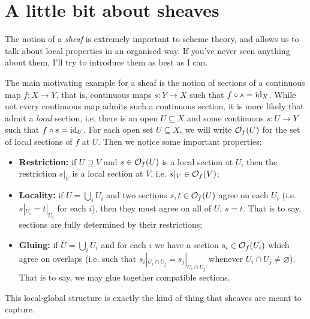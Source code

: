 \section{A little bit about sheaves}
\label{appendix:A_sheaves}
The notion of a \emph{sheaf} is extremely important to scheme theory, and allows us to talk about local properties in an organised way. If you've never seen anything about them, I'll try to introduce them as best as I can.

\begin{eg}
	The main motivating example for a sheaf is the notion of sections of a continuous map $f:X \to Y$, that is, continuous maps $s:Y \to X$ such that $f \circ s = \mathrm{id}_X$. While not every continuous map admits such a continuous section, it is more likely that admit a \emph{local} section, i.e. there is an open $U \subseteq X$ and some continuous $s : U \to Y$ such that $f \circ s = \mathrm{id}_U$. For each open set $U \subseteq X$, we will write $\mathcal{O}_f (U)$ for the set of local sections of $f$ at $U$. Then we notice some important properties:
	\begin{itemize}
		\item \textbf{Restriction:} if $U \supseteq V$ and $s \in \mathcal{O}_f(U)$ is a local section at $U$, then the restriction $s|_V$ is a local section at $V$, i.e. $s|_V \in \mathcal{O}_f(V)$;
		\item \textbf{Locality:} if $U = \bigcup_i U_i$ and two sections $s,t \in \mathcal{O}_f(U)$ agree on each $U_i$ (i.e. $s|_{U_i} = t|_{U_i}$ for each $i$), then they must agree on all of $U$, $s=t$. That is to say, sections are fully determined by their restrictions;
		\item \textbf{Gluing:} if $U = \bigcup_i U_i$ and for each $i$ we have a section $s_i \in \mathcal{O}_f(U_i)$ which agree on overlaps (i.e. such that $s_i|_{U_i \cap U_j} = s_j|_{U_i \cap U_j}$ whenever $U_i \cap U_j \neq \varnothing$). That is to say, we may glue together compatible sections.
	\end{itemize}
	This local-global structure is exactly the kind of thing that sheaves are meant to capture.
\end{eg}

